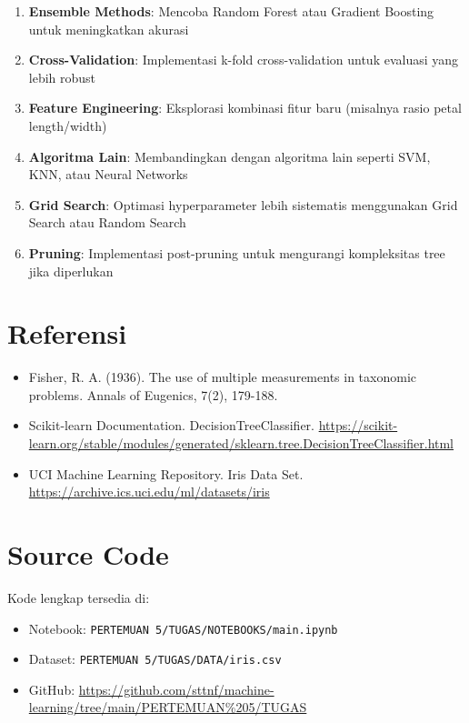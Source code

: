 \documentclass[11pt,a4paper]{article}
\begin{document}
\begin{enumerate}
    \item \textbf{Ensemble Methods}: Mencoba Random Forest atau Gradient Boosting untuk meningkatkan akurasi

    \item \textbf{Cross-Validation}: Implementasi k-fold cross-validation untuk evaluasi yang lebih robust

    \item \textbf{Feature Engineering}: Eksplorasi kombinasi fitur baru (misalnya rasio petal length/width)

    \item \textbf{Algoritma Lain}: Membandingkan dengan algoritma lain seperti SVM, KNN, atau Neural Networks

    \item \textbf{Grid Search}: Optimasi hyperparameter lebih sistematis menggunakan Grid Search atau Random Search

    \item \textbf{Pruning}: Implementasi post-pruning untuk mengurangi kompleksitas tree jika diperlukan
\end{enumerate}

\section{Referensi}

\begin{itemize}
    \item Fisher, R. A. (1936). The use of multiple measurements in taxonomic problems. Annals of Eugenics, 7(2), 179-188.

    \item Scikit-learn Documentation. DecisionTreeClassifier. \url{https://scikit-learn.org/stable/modules/generated/sklearn.tree.DecisionTreeClassifier.html}

    \item UCI Machine Learning Repository. Iris Data Set. \url{https://archive.ics.uci.edu/ml/datasets/iris}
\end{itemize}

\appendix

\section{Source Code}

Kode lengkap tersedia di:
\begin{itemize}
    \item Notebook: \texttt{PERTEMUAN 5/TUGAS/NOTEBOOKS/main.ipynb}
    \item Dataset: \texttt{PERTEMUAN 5/TUGAS/DATA/iris.csv}
    \item GitHub: \url{https://github.com/sttnf/machine-learning/tree/main/PERTEMUAN%205/TUGAS}
\end{itemize}
\end{document}

